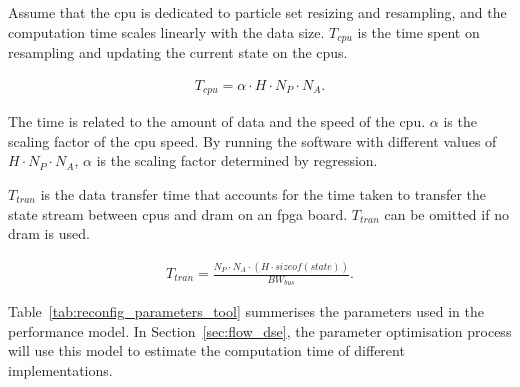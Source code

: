 Assume that the \gls{cpu} is dedicated to particle set resizing and resampling, and the computation time scales linearly with the data size.
$T_{cpu}$ is the time spent on resampling and updating the current state on the \glspl{cpu}.

\begin{equation}
\begin{aligned}
T_{cpu} = \alpha \cdot H \cdot N_P \cdot N_A \mbox{.}
\end{aligned}
\end{equation}

The time is related to the amount of data and the speed of the \gls{cpu}.
$\alpha$ is the scaling factor of the \gls{cpu} speed.
By running the software with different values of $H \cdot N_P \cdot N_A$, $\alpha$ is the scaling factor determined by regression.

$T_{tran}$ is the data transfer time that accounts for the time taken to transfer the state stream between \glspl{cpu} and \gls{dram} on an \gls{fpga} board.
$T_{tran}$ can be omitted if no \gls{dram} is used.

\begin{equation}
\begin{aligned}
T_{tran} = \frac{N_P \cdot N_A \cdot \left ( H \cdot sizeof(state)\right)}{BW_{bus}} \mbox{.}
\end{aligned}
\end{equation}



Table~\ref{tab:reconfig_parameters_tool} summerises the parameters used in the performance model.
In Section~\ref{sec:flow_dse}, the parameter optimisation process will use this model to estimate the computation time of different implementations.

